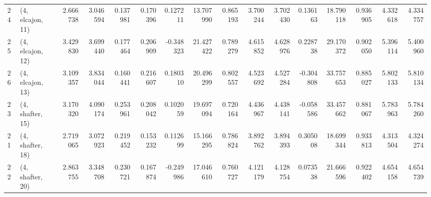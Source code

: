 \begin{tabular}{llrrrrrrrrrrrrrr}
24 &  (4, elcajon, 11) &  2.666738 &   3.046594 &   0.137981 &  0.170396 &  0.127211 &   13.707990 &  0.865193 &   3.700244 &   3.702430 &  0.136163 &   18.790118 &  0.936905 &   4.332618 &   4.334757 \\
25 &  (4, elcajon, 12) &  3.429830 &   3.699440 &   0.177464 &  0.206909 & -0.348323 &   21.427422 &  0.789279 &   4.615852 &   4.628976 &  0.228738 &   29.170372 &  0.902050 &   5.396114 &   5.400960 \\
26 &  (4, elcajon, 13) &  3.109357 &   3.834044 &   0.160441 &  0.216607 &  0.180310 &   20.496299 &  0.802557 &   4.523692 &   4.527284 & -0.304808 &   33.757653 &  0.885027 &   5.802133 &   5.810134 \\
23 &  (4, shafter, 15) &  3.170320 &   4.090174 &   0.253961 &  0.208042 &  0.102059 &   19.697094 &  0.720164 &   4.436967 &   4.438141 & -0.058586 &   33.457662 &  0.881067 &   5.783963 &   5.784260 \\
21 &  (4, shafter, 18) &  2.719065 &   3.072923 &   0.219452 &  0.153232 &  0.112699 &   15.166295 &  0.786824 &   3.892762 &   3.894393 &  0.305008 &   18.699344 &  0.933813 &   4.313504 &   4.324274 \\
22 &  (4, shafter, 20) &  2.863755 &   3.348708 &   0.230721 &  0.167874 & -0.249986 &   17.046610 &  0.760727 &   4.121179 &   4.128754 &  0.073538 &   21.666596 &  0.922402 &   4.654158 &   4.654739 \\
\bottomrule
\end{tabular}
